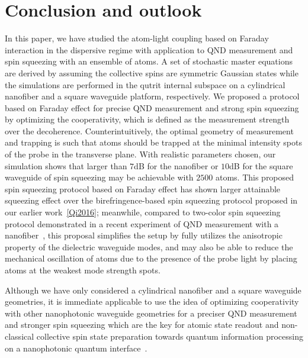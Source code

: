 \documentclass[preprint,aps,pra,onecolumn,superscriptaddress]{revtex4-1} %
\begin{document}
\section{Conclusion and outlook}
In this paper, we have studied the atom-light coupling based on Faraday interaction in the dispersive regime with application to QND measurement and spin squeezing with an ensemble of atoms. A set of stochastic master equations are derived by assuming the collective spins are symmetric Gaussian states while the simulations are performed in the qutrit internal subspace on a cylindrical nanofiber and a square waveguide platform, respectively. We proposed a protocol based on Faraday effect for precise QND measurement and strong spin squeezing by optimizing the cooperativity, which is defined as the measurement strength over the decoherence. Counterintuitively, the optimal geometry of measurement and trapping is such that atoms should be trapped at the minimal intensity spots of the probe in the transverse plane. With realistic parameters chosen, our simulation shows that larger than $ 7 $dB for the nanofiber or $ 10 $dB for the square waveguide of spin squeezing may be achievable with $ 2500 $ atoms. This proposed spin squeezing protocol based on Faraday effect has shown larger attainable squeezing effect over the birefringence-based spin squeezing protocol proposed in our earlier work~\ref{Qi2016}; meanwhile, compared to two-color spin squeezing protocol demonstrated in a recent experiment of QND measurement with a nanofiber~\cite{Beguin2017Observation}, this proposal simplifies the setup by fully utilizes the anisotropic property of the dielectric waveguide modes, and may also be able to reduce the mechanical oscillation of atoms due to the presence of the probe light by placing atoms at the weakest mode strength spots. 

Although we have only considered a cylindrical nanofiber and a square waveguide geometries, it is immediate applicable to use the idea of optimizing cooperativity with other nanophotonic waveguide geometries for a preciser QND measurement and stronger spin squeezing which are the key for atomic state readout and non-classical collective spin state preparation towards quantum information processing on a nanophotonic quantum interface~\cite{Qi2016}. 
\end{document}
